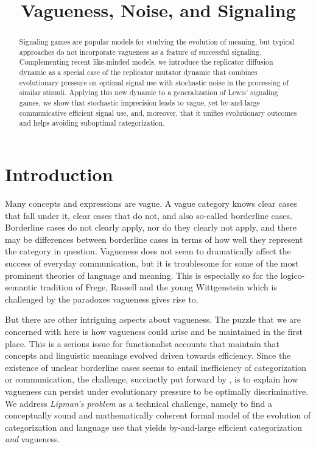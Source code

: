 \documentclass[fleqn,reqno,10pt]{article}
\title{Vagueness, Noise, and Signaling}
\date{}
\begin{document}
\maketitle

\begin{abstract}
  Signaling games are popular models for studying the evolution of
  meaning, but typical approaches do not incorporate vagueness as a
  feature of successful signaling.  Complementing recent like-minded
  models, we introduce the replicator diffusion dynamic as a special
  case of the replicator mutator dynamic that combines evolutionary
  pressure on optimal signal use with stochastic noise in the
  processing of similar stimuli. Applying this new dynamic to a
  generalization of Lewis' signaling games, we show that stochastic
  imprecision leads to vague, yet by-and-large communicative efficient
  signal use, and, moreover, that it unifies evolutionary outcomes and helps
  avoiding suboptimal categorization.
\end{abstract}

\section{Introduction}
\label{sec:introduction}

Many concepts and expressions are vague. A vague category knows clear
cases that fall under it, clear cases that do not, and also so-called
borderline cases. Borderline cases do not clearly apply, nor do they
clearly not apply, and there may be differences between borderline
cases in terms of how well they represent the category in
question. Vagueness does not seem to dramatically affect the success
of everyday communication, but it is troublesome for some of the most
prominent theories of language and meaning. This is especially so for the logico-semantic tradition of Frege, Russell and the young
Wittgenstein which is challenged by the paradoxes vagueness gives rise
to. 

But there are other intriguing aspects about vagueness. The puzzle
that we are concerned with here is how vagueness could arise and be
maintained in the first place. This is a serious issue for
functionalist accounts that maintain that concepts and linguistic
meanings evolved driven towards efficiency. Since the existence of
unclear borderline cases seems to entail inefficiency of
categorization or communication, the challenge, succinctly put forward
by \citet{Lipman2009:Why-is-Language}, is to explain how vagueness can
persist under evolutionary pressure to be optimally discriminative. We
address \emph{Lipman's problem} as a technical challenge, namely to
find a conceptually sound and mathematically coherent formal model of
the evolution of categorization and language use that yields
by-and-large efficient categorization \emph{and} vagueness.
\end{document}
